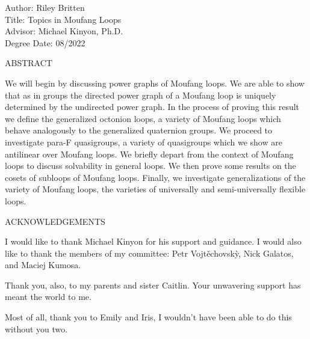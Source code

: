 \documentclass[12pt, twoside, openright]{report}
\theoremstyle{definition}
\begin{document}
\addtocounter{page}{1}

\newpage %


\noindent
\vspace{-3mm}Author: Riley Britten\\
\vspace{-3mm}Title: Topics in Moufang Loops\\
\vspace{-3mm}Advisor: Michael Kinyon, Ph.D.\\
Degree Date: 08/2022\\

\centerline{ABSTRACT}
We will begin by discussing power graphs of Moufang loops. We are able to show that as in groups the directed
  power graph of a Moufang loop is uniquely determined by the undirected power graph. In the process of proving
  this result we define the generalized octonion loops, a variety of Moufang loops which behave analogously to
  the generalized quaternion groups. We proceed to investigate para-F quasigroups, a variety of quasigroups
  which we show are antilinear over Moufang loops. We briefly depart from the context of Moufang loops to discuss
  solvability in general loops. We then prove some results on the cosets of subloops of Moufang loops. Finally,
  we investigate generalizations of the variety of Moufang loops, the varieties of universally and
  semi-universally flexible loops.
\newpage

\centerline{ACKNOWLEDGEMENTS}

I would like to thank Michael Kinyon for his support and guidance. I would also like to thank the members of my
  committee: Petr Vojt\v{e}chovsk\`{y}, Nick Galatos, and Maciej Kumosa.

Thank you, also, to my parents and sister Caitlin. Your unwavering support has meant the world to me.

Most of all, thank you to Emily and Iris, I wouldn't have been able to do this without you two.

\newpage

\tableofcontents

\listoftables

\listoffigures
%
\end{document}
